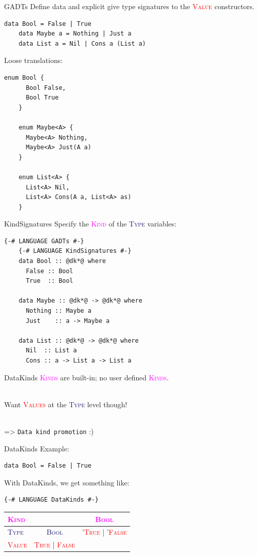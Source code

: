 \documentclass[xcolor={usenames,dvipsnames}]{beamer}
\newcommand{\htycon}[1]{\textcolor{MidnightBlue}{\textsc{#1}}}
\newcommand{\hvalcon}[1]{\textcolor{Red}{\textsc{#1}}}
\newcommand{\hkind}[1]{\textcolor{Fuchsia}{\textsc{#1}}}
\begin{document}
\begin{frame}[fragile]{GADTs}
  Define data and explicit give type signatures to the \hvalcon{Value} constructors.
  \begin{lstlisting}[style=hask]
    data Bool = False | True
    data Maybe a = Nothing | Just a
    data List a = Nil | Cons a (List a)
  \end{lstlisting}

  Loose translations:
  \begin{lstlisting}[style=hask]
    enum Bool {
      Bool False,
      Bool True
    }

    enum Maybe<A> {
      Maybe<A> Nothing,
      Maybe<A> Just(A a)
    }

    enum List<A> {
      List<A> Nil,
      List<A> Cons(A a, List<A> as)
    }
  \end{lstlisting}
\end{frame}

\begin{frame}[fragile]{KindSignatures}
  Specify the \hkind{Kind} of the \htycon{Type} variables:
  \begin{lstlisting}[style=hask]
    {-# LANGUAGE GADTs #-}
    {-# LANGUAGE KindSignatures #-}
    data Bool :: @dk*@ where
      False :: Bool
      True  :: Bool

    data Maybe :: @dk*@ -> @dk*@ where
      Nothing :: Maybe a
      Just    :: a -> Maybe a

    data List :: @dk*@ -> @dk*@ where
      Nil  :: List a
      Cons :: a -> List a -> List a
  \end{lstlisting}
\end{frame}

\begin{frame}[fragile]{DataKinds}
  \hkind{Kinds} are built-in; no user defined \hkind{Kinds}.

  \ \\
  Want \hvalcon{Values} at the \htycon{Type} level though!

  \ \\
  => \texttt{Data kind promotion} :)
\end{frame}

\begin{frame}[fragile]{DataKinds}
  Example:
  \begin{lstlisting}[style=hask]
    data Bool = False | True
  \end{lstlisting}

  With DataKinds, we get something like:
  \begin{lstlisting}[style=hask]
    {-# LANGUAGE DataKinds #-}
  \end{lstlisting}
  \begin{tabular}{l || c | c}
    \hkind{Kind} & \ & \hkind{Bool} \\
    \hline \htycon{Type} & \htycon{Bool} & \htycon{'}\hvalcon{True} | \htycon{'}\hvalcon{False} \\
    \hline \hvalcon{Value} & \hvalcon{True} | \hvalcon{False} & \ \\
  \end{tabular}
\end{frame}
\end{document}
